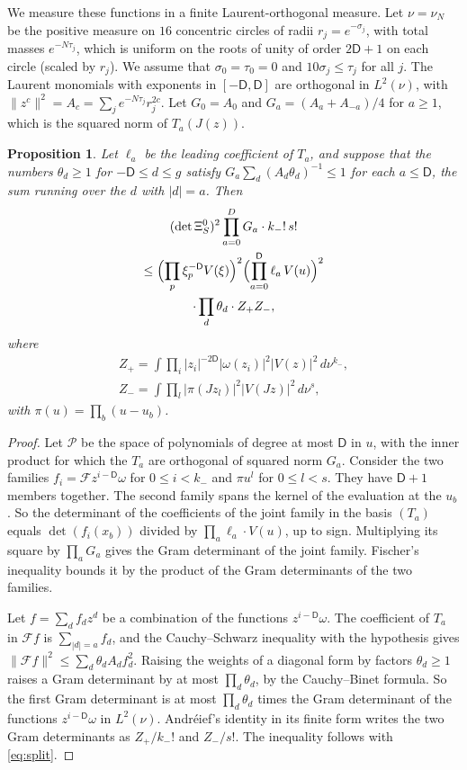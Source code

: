 \documentclass[11pt]{amsart}
\newtheorem{proposition}[theorem]{Proposition}
\theoremstyle{definition}
\theoremstyle{remark}
\numberwithin{equation}{section}
\begin{document}
We measure these functions in a finite Laurent-orthogonal measure. Let $\nu=\nu_N$ be the positive measure on $16$
concentric circles of radii $r_j=e^{-\sigma_j}$, with total masses $e^{-N\tau_j}$, which is uniform on the roots of unity
of order $2\mathsf D+1$ on each circle (scaled by $r_j$). We assume that $\sigma_0=\tau_0=0$ and $10\sigma_j\le\tau_j$ for all
$j$. The Laurent monomials with exponents in $[-\mathsf D,\mathsf D]$ are orthogonal in $L^2(\nu)$, with $\|z^c\|^2=A_c=\sum_je^{-N\tau_j}r_j^{2c}$. Let $G_0=A_0$ and $G_a=(A_a+A_{-a})/4$ for $a\ge1$, which is the squared
norm of $T_a(J(z))$.

\begin{proposition}\label{prop:gram}
Let $\ell_a$ be the leading coefficient of $T_a$, and suppose that the numbers $\theta_d\ge1$ for $-\mathsf D\le d\le g$ satisfy
$G_a\sum_{d}(A_d\theta_d)^{-1}\le1$ for each $a\le \mathsf D$, the sum running over the $d$ with $|d|=a$. Then
\begin{multline*}
 (\det\Xi^0_S)^2\prod_{a=0}^DG_a\cdot k_-!\,s!\\
 \le\Bigl(\prod_p\xi_p^{-\mathsf D}V(\xi)\Bigr)^2\Bigl(\prod_{a=0}^{\mathsf D}\ell_a\,V(u)\Bigr)^2\\
 \cdot\prod_d\theta_d\cdot Z_+Z_-,
\end{multline*}
where
\begin{gather*}
 Z_+=\int\prod_i|z_i|^{-2\mathsf D}|\omega(z_i)|^2|V(z)|^2\,d\nu^{k_-},\\
 Z_-=\int\prod_l|\pi(Jz_l)|^2|V(Jz)|^2\,d\nu^{s},
\end{gather*}
with $\pi(u)=\prod_b(u-u_b)$.
\end{proposition}

\begin{proof}
Let $\mathcal P$ be the space of polynomials of degree at most $\mathsf D$ in $u$, with the inner product for which the $T_a$ are
orthogonal of squared norm $G_a$. Consider the two families $f_i=\mathcal Fz^{i-\mathsf D}\omega$ for $0\le i<k_-$ and $\pi u^l$ for $0\le l<s$.
They have $\mathsf D+1$ members together. The second family spans the kernel of the evaluation at the $u_b$. So the
determinant of the coefficients of the joint family in the basis $(T_a)$ equals $\det(f_i(x_b))$ divided by
$\prod_a\ell_a\cdot V(u)$, up to sign. Multiplying its square by $\prod_aG_a$ gives the Gram determinant of the joint family.
Fischer's inequality bounds it by the product of the Gram determinants of the two families.

Let $f=\sum_df_dz^d$ be a combination of the functions $z^{i-\mathsf D}\omega$. The coefficient of $T_a$ in $\mathcal Ff$ is
$\sum_{|d|=a}f_d$, and the Cauchy--Schwarz inequality with the hypothesis gives $\|\mathcal Ff\|^2\le\sum_d\theta_dA_df_d^2$. Raising
the weights of a diagonal form by factors $\theta_d\ge1$ raises a Gram determinant by at most $\prod_d\theta_d$, by the
Cauchy--Binet formula. So the first Gram determinant is at most $\prod_d\theta_d$ times the Gram determinant of the
functions $z^{i-\mathsf D}\omega$ in $L^2(\nu)$. Andr\'eief's identity \cite{Forrester2018Andreief} in its finite form writes the two Gram
determinants as $Z_+/k_-!$ and $Z_-/s!$. The inequality follows with \eqref{eq:split}.
\end{proof}
\end{document}
